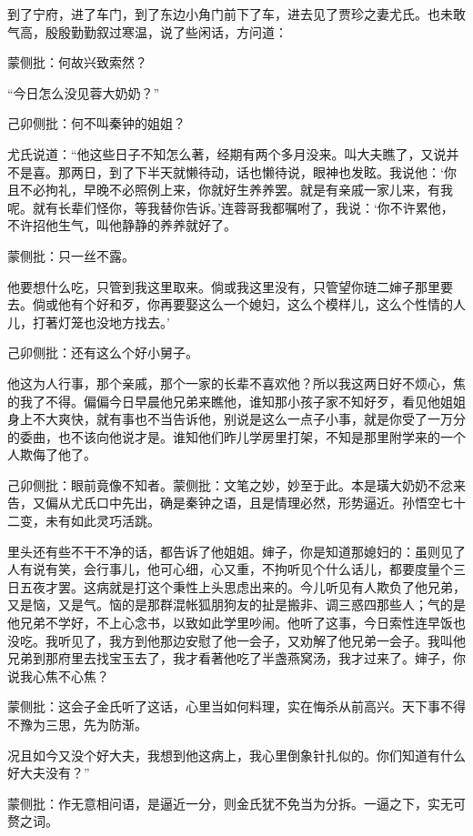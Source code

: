\begin{parag}


    到了宁府，进了车门，到了东边小角门前下了车，进去见了贾珍之妻尤氏。也未敢气高，殷殷勤勤叙过寒温，说了些闲话，方问道：\begin{note}蒙侧批：何故兴致索然？\end{note}“今日怎么没见蓉大奶奶？”\begin{note}己卯侧批：何不叫秦钟的姐姐？\end{note}尤氏说道：“他这些日子不知怎么著，经期有两个多月没来。叫大夫瞧了，又说并不是喜。那两日，到了下半天就懒待动，话也懒待说，眼神也发眩。我说他：‘你且不必拘礼，早晚不必照例上来，你就好生养养罢。就是有亲戚一家儿来，有我呢。就有长辈们怪你，等我替你告诉。’连蓉哥我都嘱咐了，我说：‘你不许累他，不许招他生气，叫他静静的养养就好了。\begin{note}蒙侧批：只一丝不露。\end{note}他要想什么吃，只管到我这里取来。倘或我这里没有，只管望你琏二婶子那里要去。倘或他有个好和歹，你再要娶这么一个媳妇，这么个模样儿，这么个性情的人儿，打著灯笼也没地方找去。’\begin{note}己卯侧批：还有这么个好小舅子。\end{note}他这为人行事，那个亲戚，那个一家的长辈不喜欢他？所以我这两日好不烦心，焦的我了不得。偏偏今日早晨他兄弟来瞧他，谁知那小孩子家不知好歹，看见他姐姐身上不大爽快，就有事也不当告诉他，别说是这么一点子小事，就是你受了一万分的委曲，也不该向他说才是。谁知他们昨儿学房里打架，不知是那里附学来的一个人欺侮了他了。\begin{note}己卯侧批：眼前竟像不知者。蒙侧批：文笔之妙，妙至于此。本是璜大奶奶不忿来告，又偏从尤氏口中先出，确是秦钟之语，且是情理必然，形势逼近。孙悟空七十二变，未有如此灵巧活跳。\end{note}里头还有些不干不净的话，都告诉了他姐姐。婶子，你是知道那媳妇的：虽则见了人有说有笑，会行事儿，他可心细，心又重，不拘听见个什么话儿，都要度量个三日五夜才罢。这病就是打这个秉性上头思虑出来的。今儿听见有人欺负了他兄弟，又是恼，又是气。恼的是那群混帐狐朋狗友的扯是搬非、调三惑四那些人；气的是他兄弟不学好，不上心念书，以致如此学里吵闹。他听了这事，今日索性连早饭也没吃。我听见了，我方到他那边安慰了他一会子，又劝解了他兄弟一会子。我叫他兄弟到那府里去找宝玉去了，我才看著他吃了半盏燕窝汤，我才过来了。婶子，你说我心焦不心焦？\begin{note}蒙侧批：这会子金氏听了这话，心里当如何料理，实在悔杀从前高兴。天下事不得不豫为三思，先为防渐。\end{note}况且如今又没个好大夫，我想到他这病上，我心里倒象针扎似的。你们知道有什么好大夫没有？”\begin{note}蒙侧批：作无意相问语，是逼近一分，则金氏犹不免当为分拆。一逼之下，实无可赘之词。\end{note}
\end{parag}


